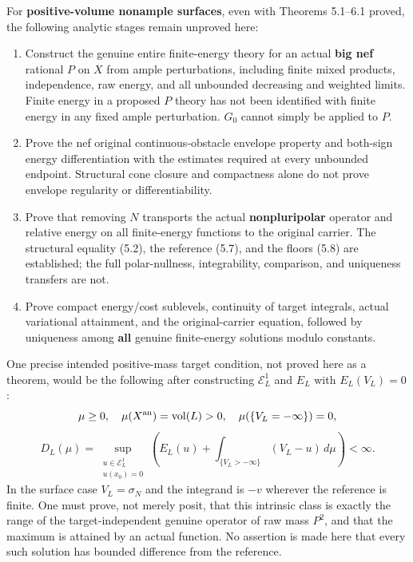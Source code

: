 \documentclass[
  10pt,
]{article}
\providecommand{\tightlist}{%
  \setlength{\itemsep}{0pt}\setlength{\parskip}{0pt}}
\begin{document}
For \textbf{positive-volume nonample surfaces}, even with Theorems
5.1--6.1 proved, the following analytic stages remain unproved here:

\begin{enumerate}
\def\labelenumi{\arabic{enumi}.}
\tightlist
\item
  Construct the genuine entire finite-energy theory for an actual
  \textbf{big nef} rational \(P\) on \(X\) from ample perturbations,
  including finite mixed products, independence, raw energy, and all
  unbounded decreasing and weighted limits. Finite energy in a proposed
  \(P\) theory has not been identified with finite energy in any fixed
  ample perturbation. \(G_0\) cannot simply be applied to \(P\).
\item
  Prove the nef original continuous-obstacle envelope property and
  both-sign energy differentiation with the estimates required at every
  unbounded endpoint. Structural cone closure and compactness alone do
  not prove envelope regularity or differentiability.
\item
  Prove that removing \(N\) transports the actual \textbf{nonpluripolar}
  operator and relative energy on all finite-energy functions to the
  original carrier. The structural equality (5.2), the reference (5.7),
  and the floors (5.8) are established; the full polar-nullness,
  integrability, comparison, and uniqueness transfers are not.
\item
  Prove compact energy/cost sublevels, continuity of target integrals,
  actual variational attainment, and the original-carrier equation,
  followed by uniqueness among \textbf{all} genuine finite-energy
  solutions modulo constants.
\end{enumerate}

One precise intended positive-mass target condition, not proved here as
a theorem, would be the following after constructing \(\mathcal E^1_L\)
and \(E_L\) with \(E_L(V_L)=0\): \[
 \mu\geq0,\quad \mu(X^{\rm an})=\operatorname{vol}(L)>0,
 \quad\mu(\{V_L=-\infty\})=0,
\] \[
 D_L(\mu)=\sup_{\substack{u\in\mathcal E^1_L\\u(x_0)=0}}
 \left(E_L(u)+\int_{\{V_L>-\infty\}}(V_L-u)\,d\mu\right)<\infty.
                                                               \tag{11.1}
\] In the surface case \(V_L=\sigma_N\) and the integrand is \(-v\)
wherever the reference is finite. One must prove, not merely posit, that
this intrinsic class is exactly the range of the target-independent
genuine operator of raw mass \(P^2\), and that the maximum is attained
by an actual function. No assertion is made here that every such
solution has bounded difference from the reference.
\end{document}
